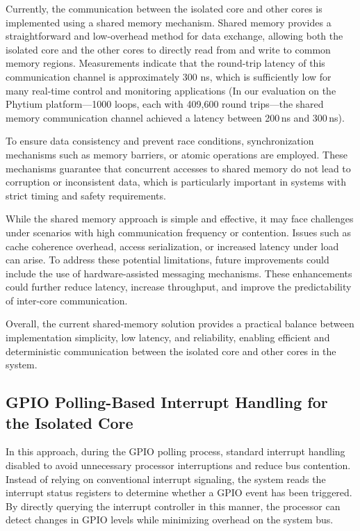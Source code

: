 \documentclass[letterpaper]{article}
\begin{document}
Currently, the communication between the isolated core and other cores is implemented using
a shared memory mechanism. Shared memory provides a straightforward and low-overhead method for
data exchange, allowing both the isolated core and the other cores to directly read from and
write to common memory regions. Measurements indicate that the round-trip latency of this
communication channel is approximately 300 ns, which is sufficiently low for many real-time
control and monitoring applications (In our evaluation on the Phytium platform---1000 loops,
each with 409{,}600 round trips---the shared memory communication channel achieved a latency
between 200\,ns and 300\,ns).
 

To ensure data consistency and prevent race conditions, synchronization mechanisms such as
memory barriers, or atomic operations are employed. These mechanisms guarantee that
concurrent accesses to shared memory do not lead to corruption or inconsistent data, which is
particularly important in systems with strict timing and safety requirements.

While the shared memory approach is simple and effective, it may face challenges under scenarios
with high communication frequency or contention. Issues such as cache coherence overhead, access
serialization, or increased latency under load can arise. To address these potential limitations,
future improvements could include the use of hardware-assisted messaging mechanisms.
These enhancements could further reduce latency, increase throughput, and improve the predictability
of inter-core communication.

Overall, the current shared-memory solution provides a practical balance between implementation
simplicity, low latency, and reliability, enabling efficient and deterministic communication
between the isolated core and other cores in the system.

\subsection{GPIO Polling-Based Interrupt Handling for the Isolated Core}

In this approach, during the GPIO polling process, standard interrupt handling disabled to
avoid unnecessary processor interruptions and reduce bus contention. Instead of relying on
conventional interrupt signaling, the system reads the interrupt status registers to determine
whether a GPIO event has been triggered. By directly querying the interrupt controller in this
manner, the processor can detect changes in GPIO levels while minimizing overhead on the system bus.
\end{document}
